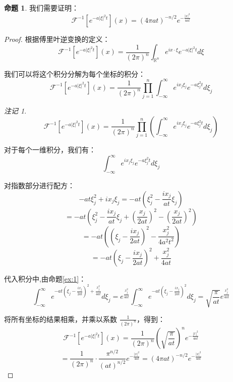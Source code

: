 \documentclass[12pt,a4paper]{article}
\numberwithin{subsection}{section}   %
\numberwithin{subsubsection}{subsection}
\theoremstyle{plain}
\theoremstyle{definition}
\newtheorem{example}{命题}[subsection]  %
\theoremstyle{remark}
\newtheorem{remark}[theorem]{注记}
\theoremstyle{remark}
\begin{document}
	\begin{example}
		我们需要证明：
		\[
		\mathcal{F}^{-1}\left[e^{-a|\xi|^2 t}\right](x) = (4\pi a t)^{-n/2} e^{-\frac{|x|^2}{4a t}}
		\]
	\end{example}
	
	
	
	\begin{proof}
		
		根据傅里叶逆变换的定义：
		\[
		\mathcal{F}^{-1}\left[e^{-a|\xi|^2 t}\right](x) = \frac{1}{(2\pi)^n} \int_{\mathbb{R}^n} e^{i x \cdot \xi} e^{-a|\xi|^2 t} d\xi
		\]
		
		我们可以将这个积分分解为每个坐标的积分：
		\[
		\mathcal{F}^{-1}\left[e^{-a|\xi|^2 t}\right](x) = \frac{1}{(2\pi)^n} \prod_{j=1}^n \int_{-\infty}^\infty e^{i x_j \xi_j} e^{-a\xi_j^2 t} d\xi_j
		\]
		
		\begin{remark}
			\[
			\mathcal{F}^{-1}\left[e^{-a|\xi|^{2} t}\right](x)=\frac{1}{(2\pi)^{n}}\prod_{j=1}^{n}\left(\int_{-\infty}^{\infty} e^{i x_j \xi_j} e^{-a\xi_j^{2} t} d\xi_j\right)
			\]
		\end{remark}
		
		
		对于每个一维积分，我们有：
		\[
		\int_{-\infty}^\infty e^{i x_j \xi_j} e^{-a\xi_j^2 t} d\xi_j
		\]
		
		对指数部分进行配方：
		\[
		-a t \xi_j^2 + i x_j \xi_j = -a t \left( \xi_j^2 - \frac{i x_j}{a t} \xi_j \right)
		\]
		\[
		= -a t \left( \xi_j^2 - \frac{i x_j}{a t} \xi_j + \left( \frac{x_j}{2a t} \right)^2 - \left( \frac{x_j}{2a t} \right)^2 \right)
		\]
		\[
		= -a t \left( \left( \xi_j - \frac{i x_j}{2a t} \right)^2 - \frac{x_j^2}{4a^2 t^2} \right)
		\]
		\[
		= -a t \left( \xi_j - \frac{i x_j}{2a t} \right)^2 + \frac{x_j^2}{4a t}
		\]
		
		代入积分中,由命题\eqref{ex:1}：
		\[
		\int_{-\infty}^\infty e^{-a t \left( \xi_j - \frac{i x_j}{2a t} \right)^2 + \frac{x_j^2}{4a t}} d\xi_j = e^{\frac{x_j^2}{4a t}} \int_{-\infty}^\infty e^{-a t \left( \xi_j - \frac{i x_j}{2a t} \right)^2} d\xi_j= \sqrt{\frac{\pi}{a t}} e^{\frac{x_j^2}{4a t}}
		\]
		
		
		将所有坐标的结果相乘，并乘以系数 \( \frac{1}{(2\pi)^n} \)，得到：
		\[
		\mathcal{F}^{-1}\left[e^{-a|\xi|^2 t}\right](x) = \frac{1}{(2\pi)^n} \left( \sqrt{\frac{\pi}{a t}} \right)^n e^{-\frac{|x|^2}{4a t}}
		\]
		\[
		= \frac{1}{(2\pi)^n} \cdot \frac{\pi^{n/2}}{(a t)^{n/2}} e^{-\frac{|x|^2}{4a t}} = (4\pi a t)^{-n/2} e^{-\frac{|x|^2}{4a t}}
		\]
		
	\end{proof}
	
\end{document}
